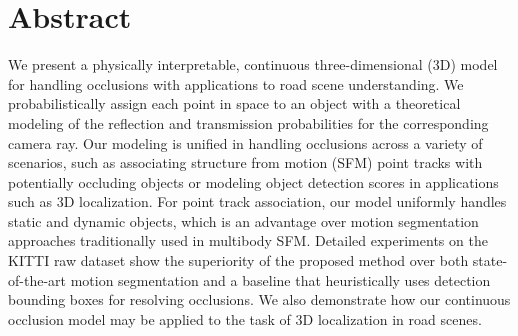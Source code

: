 \section{Abstract}
We present a physically interpretable, continuous three-dimensional (3D) model for handling occlusions with applications to road scene understanding. We probabilistically assign each point in space to an object with a theoretical modeling of the reflection and transmission probabilities for the corresponding camera ray. Our modeling is unified in handling occlusions across a variety of scenarios, such as associating structure from motion (SFM) point tracks with potentially occluding objects or modeling object detection scores in applications such as 3D localization. For point track association, our model uniformly handles static and dynamic objects, which is an advantage over motion segmentation approaches traditionally used in multibody SFM. Detailed experiments on the KITTI raw dataset show the superiority of the proposed method over both state-of-the-art motion segmentation and a baseline that heuristically uses detection bounding boxes for resolving occlusions. We also demonstrate how our continuous occlusion model may be applied to the task of 3D localization in road scenes.

